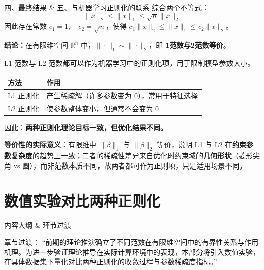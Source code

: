 \documentclass[aspectratio=169]{beamer}
\begin{document}
\begin{frame}{四、最终结果 \& 五、与机器学习正则化的联系}
    综合两个不等式：
    $$ \|x\|_2 \le \|x\|_1 \le \sqrt{n}\|x\|_2 $$
    因此存在常数 $c_1=1,\quad c_2=\sqrt{n}$，使得 $c_1\|x\|_2 \le \|x\|_1 \le c_2\|x\|_2$。
    
    \textbf{结论：}在有限维空间 $\mathbb{R}^n$ 中，$\|\cdot\|_1 \sim \|\cdot\|_2$，即 \textbf{1范数与2范数等价}。
    
    \vspace{0.4cm}
    L1 范数与 L2 范数都可以作为机器学习中的正则化项，用于限制模型参数大小。
    
    \begin{table}[]
        \centering
        \begin{tabular}{|l|l|}
        \hline
        \textbf{方法} & \textbf{作用} \\ \hline
        L1 正则化 & 产生稀疏解（许多参数变为 0），常用于特征选择 \\ \hline
        L2 正则化 & 使参数整体变小，但通常不会变为 0 \\ \hline
        \end{tabular}
    \end{table}
    
    因此：\textbf{两种正则化理论目标一致，但优化结果不同。}
    
    \vspace{0.3cm}
    \textbf{等价性的实际意义}：有限维中 $\|\beta\|_1$ 与 $\|\beta\|_2$ 等价，说明 L1 与 L2 在\textbf{约束参数复杂度}的趋势上一致；二者的稀疏性差异来自优化时约束域的\textbf{几何形状}（菱形尖角 vs 圆），而非范数本质不同，故两者都可作为正则项，只是适用场景不同。
\end{frame}


\section{数值实验对比两种正则化}

\begin{frame}{内容大纲 \& 环节过渡}
    \tableofcontents[currentsection]
    \vspace{0.5cm}
    \begin{block}{章节过渡：}
        “前期的理论推演确立了不同范数在有限维空间中的有界性关系与作用机理。为进一步验证理论推导在实际计算环境中的表现，本部分将引入数值实验，在具体数据集下量化对比两种正则化的收敛过程与参数稀疏度指标。”
    \end{block}
\end{frame}
\end{document}
